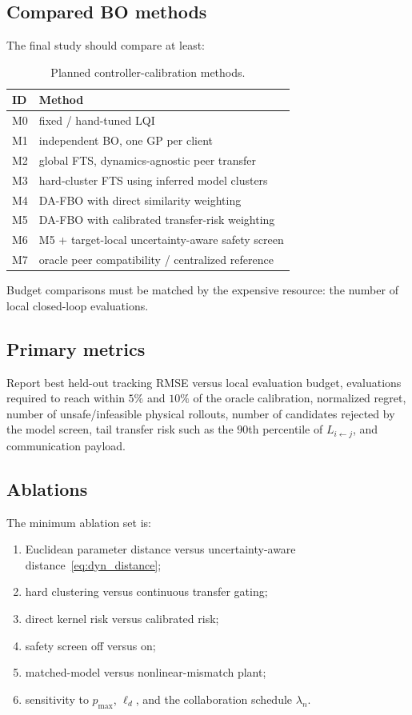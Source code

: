 \documentclass[conference]{IEEEtran}
\newcommand{\method}{DA-FBO}
\begin{document}
\subsection{Compared BO methods}
The final study should compare at least:
\begin{table}[t]
\centering
\caption{Planned controller-calibration methods.}
\label{tab:methods}
\scriptsize
\begin{tabular}{@{}ll@{}}
\toprule
\textbf{ID} & \textbf{Method} \\
\midrule
M0 & fixed / hand-tuned LQI \\
M1 & independent BO, one GP per client \\
M2 & global FTS, dynamics-agnostic peer transfer \\
M3 & hard-cluster FTS using inferred model clusters \\
M4 & \method{} with direct similarity weighting \\
M5 & \method{} with calibrated transfer-risk weighting \\
M6 & M5 + target-local uncertainty-aware safety screen \\
M7 & oracle peer compatibility / centralized reference \\
\bottomrule
\end{tabular}
\end{table}
Budget comparisons must be matched by the expensive resource: the number of local closed-loop evaluations.

\subsection{Primary metrics}
Report best held-out tracking RMSE versus local evaluation budget, evaluations required to reach within $5\%$ and $10\%$ of the oracle calibration, normalized regret, number of unsafe/infeasible physical rollouts, number of candidates rejected by the model screen, tail transfer risk such as the $90$th percentile of $L_{i\leftarrow j}$, and communication payload.

\subsection{Ablations}
The minimum ablation set is:
\begin{enumerate}
\item Euclidean parameter distance versus uncertainty-aware distance~\eqref{eq:dyn_distance};
\item hard clustering versus continuous transfer gating;
\item direct kernel risk versus calibrated risk;
\item safety screen off versus on;
\item matched-model versus nonlinear-mismatch plant;
\item sensitivity to $p_{\max}$, $\ell_d$, and the collaboration schedule $\lambda_n$.
\end{enumerate}
\end{document}
